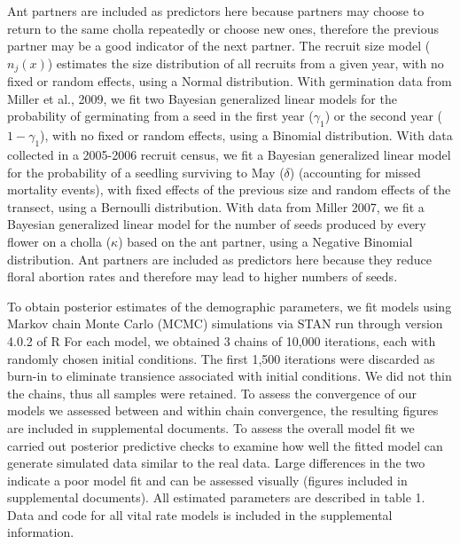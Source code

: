 \documentclass[11pt]{article}\usepackage[sc]{mathpazo} %
\begin{document}
Ant partners are included as predictors here because partners may choose to return to the same cholla repeatedly or choose new ones, therefore the previous partner may be a good indicator of the next partner. 
The recruit size model ($n_j(x)$) estimates the size distribution of all recruits from a given year, with no fixed or random effects, using a Normal distribution. 
With germination data from Miller et al., 2009, we fit two Bayesian generalized linear models for the probability of germinating from a seed in the first year ($\gamma_1$) or the second year ($1 - \gamma_1$), with no fixed or random effects, using a Binomial distribution.
With data collected in a 2005-2006 recruit census, we fit a Bayesian generalized linear model for the probability of a seedling surviving to May ($\delta$) (accounting for missed mortality events), with fixed effects of the previous size and random effects of the transect, using a Bernoulli distribution. 
With data from Miller 2007, we fit a Bayesian generalized linear model for the number of seeds produced by every flower on a cholla ($\kappa$) based on the ant partner, using a Negative Binomial distribution. 
Ant partners are included as predictors here because they reduce floral abortion rates and therefore may lead to higher numbers of seeds. 

  To obtain posterior estimates of the demographic parameters, we fit models using Markov chain Monte Carlo (MCMC) simulations via STAN run through version 4.0.2 of R 
For each model, we obtained 3 chains of 10,000 iterations, each with randomly chosen initial conditions. 
The first 1,500 iterations were discarded as burn-in to eliminate transience associated with initial conditions. 
We did not thin the chains, thus all samples were retained. 
To assess the convergence of our models we assessed between and within chain convergence, the resulting figures are included in supplemental documents. 
To assess the overall model fit we carried out posterior predictive checks to examine how well the fitted model can generate simulated data similar to the real data.
Large differences in the two indicate a poor model fit and can be assessed visually (figures included in supplemental documents). 
All estimated parameters are described in table 1.
Data and code for all vital rate models is included in the supplemental information.
\end{document}
